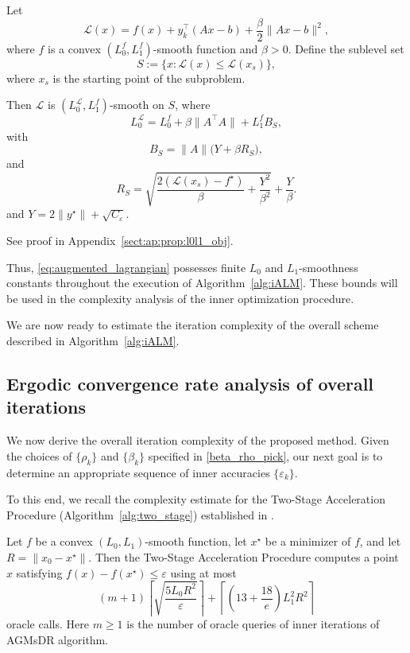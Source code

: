\documentclass[runningheads]{llncs}
\begin{document}
	\begin{proposition}\label{prop:l0l1_obj}
		Let
		\[
		\mathcal{L}(x)
		=
		f(x)
		+
		y_k^\top(Ax-b)
		+
		\frac{\beta}{2}\|Ax-b\|^2,
		\]
		where $f$ is a convex $(L_0^f,L_1^f)$-smooth function and $\beta>0$. Define the sublevel set
		\[
		S:=\{x:\mathcal{L}(x)\leq \mathcal{L}(x_s)\},
		\]
		where $x_s$ is the starting point of the subproblem.
		
		Then $\mathcal{L}$ is $(L_0^{\mathcal{L}}, L_1^{f})$-smooth on $S$, where
		\begin{equation}\label{l_0def}
			L_0^{\mathcal{L}}
			=
			L_0^f
			+
			\beta\|A^\top A\|
			+
			L_1^f B_S,
		\end{equation}
		with
		\[
		B_S
		=
		\|A\|
		\bigl(
		Y
		+
		\beta R_S
		\bigr),
		\]
		and
		\[
		R_S
		=
		\sqrt{
			\frac{2(\mathcal{L}(x_s)-f^\star)}{\beta}
			+
			\frac{Y^2}{\beta^2}
		}
		+
		\frac{Y}{\beta}.
		\]
		and $Y = 2\|y^\star\| + \sqrt{C_\varepsilon}$.
	\end{proposition}
	
	See proof in Appendix~\ref{sect:ap:prop:l0l1_obj}.
	
	Thus, \eqref{eq:augmented_lagrangian} possesses finite $L_0$ and $L_1$-smoothness constants throughout the execution of Algorithm~\ref{alg:iALM}. These bounds will be used in the complexity analysis of the inner optimization procedure.
	
	We are now ready to estimate the iteration complexity of the overall scheme described in Algorithm~\ref{alg:iALM}.
	
	\subsection{Ergodic convergence rate analysis of overall iterations}
	
	We now derive the overall iteration complexity of the proposed method. Given the choices of $\{\rho_k\}$ and $\{\beta_k\}$ specified in \eqref{beta_rho_pick}, our next goal is to determine an appropriate sequence of inner accuracies $\{\varepsilon_k\}$.
	
	To this end, we recall the complexity estimate for the Two-Stage Acceleration Procedure (Algorithm~\ref{alg:two_stage}) established in \cite{vankov2025optimizing}.
	
	\begin{theorem}
		\label{th:vankov}
		Let $f$ be a convex $(L_0,L_1)$-smooth function, let $x^\star$ be a minimizer of $f$, and let $R = \|x_0 - x^\star\|$.
		Then the Two-Stage Acceleration Procedure computes a point $x$ satisfying $f(x)-f(x^\star)\leq \varepsilon$
		using at most
		\[
		(m+1)
		\left\lceil
		\sqrt{\frac{5L_0R^2}{\varepsilon}}
		\right\rceil
		+
		\left\lceil
		\left(13+\frac{18}{e}\right) L_1^2R^2
		\right\rceil
		\]
		oracle calls. Here $m \geq 1$ is the number of oracle queries of inner iterations of AGMsDR algorithm.
	\end{theorem}
	
\end{document}
